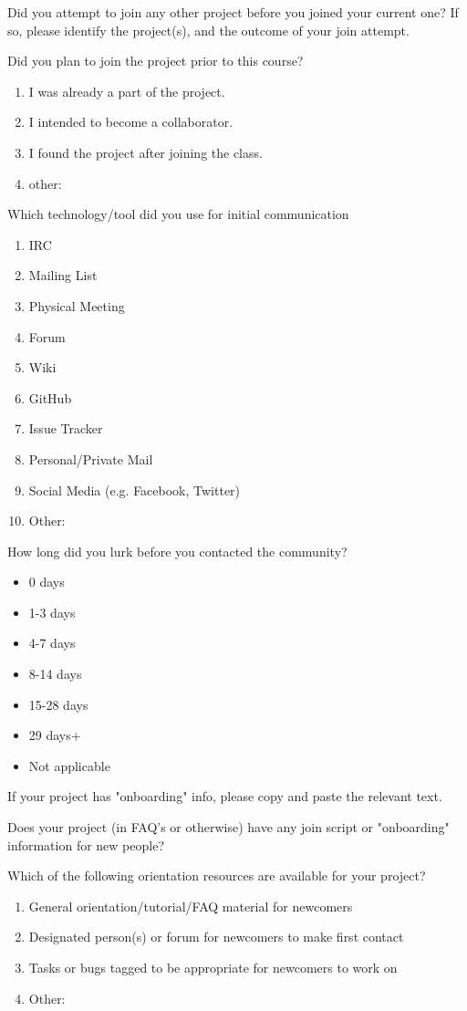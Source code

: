 \begin{table}
 Did you attempt to join any other project before you joined your current one? If so, please identify the project(s), and the outcome of your join attempt.

 Did you plan to join the project prior to this course?

\begin{enumerate}
\item  I was already a part of the project.
\item I intended to become a collaborator.
\item I found the project after joining the class.
\item other:
\end{enumerate}
 
Which technology/tool did you use for initial communication
\begin{enumerate}
\item IRC
\item Mailing List
\item Physical Meeting
\item Forum
\item Wiki
\item GitHub
\item Issue Tracker
\item Personal/Private Mail
\item Social Media (e.g. Facebook, Twitter)
\item Other:
\end{enumerate}

How long did you lurk before you contacted the community?
\begin{itemize}
\item 0 days
\item 1-3 days
\item 4-7 days
\item 8-14 days
\item 15-28 days
\item 29 days+
\item Not applicable 
\end{itemize}

If your project has "onboarding" info, please copy and paste the relevant text.

Does your project (in FAQ's or otherwise) have any join script or "onboarding" information for new people? 

Which of the following orientation resources are available for your project?
\begin{enumerate}
\item General orientation/tutorial/FAQ material for newcomers
\item Designated person(s) or forum for newcomers to make first contact
\item Tasks or bugs tagged to be appropriate for newcomers to work on
\item Other:
\end{enumerate}


\end{table}
